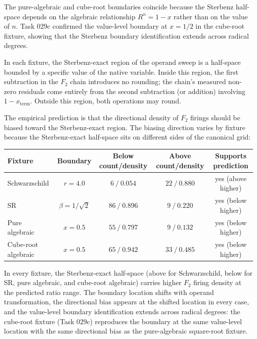\documentclass[11pt,a4paper]{article}
\begin{document}
The pure-algebraic and cube-root boundaries coincide because the Sterbenz half-space depends on the algebraic relationship $R^n = 1 - x$ rather than on the value of $n$. Task 029c confirmed the value-level boundary at $x = 1/2$ in the cube-root fixture, showing that the Sterbenz boundary identification extends across radical degrees.

In each fixture, the Sterbenz-exact region of the operand sweep is a half-space bounded by a specific value of the native variable. Inside this region, the first subtraction in the $F_2$ chain introduces no rounding; the chain's measured non-zero residuals come entirely from the second subtraction (or addition) involving $1 - x_{\mathrm{term}}$. Outside this region, both operations may round.

The empirical prediction is that the directional density of $F_2$ firings should be biased toward the Sterbenz-exact region. The biasing direction varies by fixture because the Sterbenz-exact half-space sits on different sides of the canonical grid:

\begin{center}
\begin{tabular}{lcccc}
\toprule
Fixture & Boundary & Below count/density & Above count/density & Supports prediction\\
\midrule
Schwarzschild & $r=4.0$ & $6\ /\ 0.054$ & $22\ /\ 0.880$ & yes (above higher)\\
SR & $\beta=1/\sqrt{2}$ & $86\ /\ 0.896$ & $9\ /\ 0.220$ & yes (below higher)\\
Pure algebraic & $x=0.5$ & $55\ /\ 0.797$ & $9\ /\ 0.132$ & yes (below higher)\\
Cube-root algebraic & $x=0.5$ & $65\ /\ 0.942$ & $33\ /\ 0.485$ & yes (below higher)\\
\bottomrule
\end{tabular}
\end{center}

In every fixture, the Sterbenz-exact half-space (above for Schwarzschild, below for SR, pure algebraic, and cube-root algebraic) carries higher $F_2$ firing density at the predicted ratio range. The boundary location shifts with operand transformation, the directional bias appears at the shifted location in every case, and the value-level boundary identification extends across radical degrees: the cube-root fixture (Task 029c) reproduces the boundary at the same value-level location with the same directional bias as the pure-algebraic square-root fixture.
\end{document}
